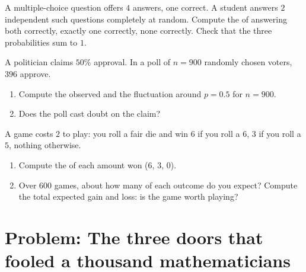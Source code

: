 \begin{exercise}[$\star\star$]\label{exo:g10:proba:7}
A multiple-choice question offers $4$ answers, one correct. A student
answers $2$ independent such questions completely at random. Compute the
 of answering both correctly, exactly one correctly, none
correctly. Check that the three probabilities sum to $1$.
\end{exercise}

\begin{exercise}[$\star\star$]\label{exo:g10:proba:8}
A politician claims $50\%$ approval. In a poll of $n = 900$ randomly
chosen voters, $396$ approve.
\begin{enumerate}
  \item Compute the observed  and the fluctuation 
        around $p = 0.5$ for $n = 900$.
  \item Does the poll cast doubt on the claim?
\end{enumerate}
\end{exercise}

\begin{exercise}[$\star\star\star$]\label{exo:g10:proba:9}
A game costs $2$ to play: you roll a fair die and win $6$ if you roll a
$6$, $3$ if you roll a $5$, nothing otherwise.
\begin{enumerate}
  \item Compute the  of each amount won ($6$, $3$, $0$).
  \item Over $600$ games, about how many of each outcome do you expect?
        Compute the total expected gain and loss: is the game worth
        playing?
\end{enumerate}
\end{exercise}

\section{Problem: The three doors that fooled a thousand
mathematicians}

